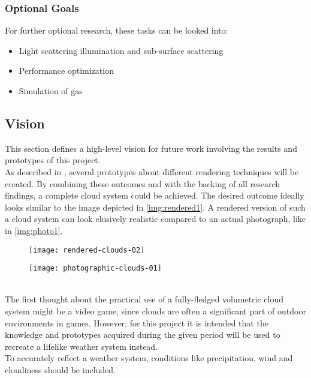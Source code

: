 \subsubsection{Optional Goals}
For further optional research, these tasks can be looked into:
\begin{itemize}
    \item Light scattering illumination and sub-surface scattering
    \item Performance optimization
    \item Simulation of gas
\end{itemize}

\clearpage

\subsection{Vision}
This section defines a high-level vision for future work involving the results and prototypes of this project. 
\\ 
As described in , several prototypes about different rendering techniques will be created.
By combining these outcomes and with the backing of all research findings, a complete cloud system could be achieved. 
The desired outcome ideally looks similar to the image depicted in \autoref{img:rendered1}. A rendered version of such a cloud system can look elusively realistic compared to an actual photograph, like in \autoref{img:photo1}.
\begin{figure}[ht]
    \centering
        \begin{minipage}{0.47\linewidth}
            \texttt{[image: rendered-clouds-02]}
            \label{img:rendered1}        
        \end{minipage}        
    \hfill
        \begin{minipage}{0.47\linewidth}
            \texttt{[image: photographic-clouds-01]}
            \label{img:photo1}        
        \end{minipage}  
\end{figure}
\\
The first thought about the practical use of a fully-fledged volumetric cloud system might be a video game, since clouds are often a significant part of outdoor environments in games.
However, for this project it is intended that the knowledge and prototypes acquired during the given period will be used to recreate a lifelike weather system instead.
\\
To accurately reflect a weather system, conditions like precipitation, wind and cloudiness should be included.


